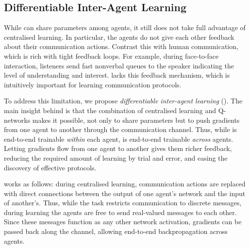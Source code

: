 \subsection{Differentiable Inter-Agent Learning}\label{subsec:diff-comm}

While \rec can share parameters among agents, it still does not take full advantage of centralised learning.  In particular, the agents do not give each other feedback about their communication actions.  Contrast this with human communication, which is rich with tight feedback loops. For example, during face-to-face interaction, listeners send fast nonverbal queues to the speaker indicating the level of understanding and interest.  \rec lacks this  feedback mechanism, which is intuitively important for learning communication protocols. 

To address this limitation, we propose \emph{differentiable inter-agent learning} (\dic).  The main insight behind \dic is that the combination of centralised learning and Q-networks makes it possible, not only to share parameters but to push gradients from one agent to another through the communication channel.  Thus, while \rec is end-to-end trainable \emph{within} each agent, \dic is end-to-end trainable \emph{across} agents.  Letting gradients flow from one agent to another gives them richer feedback, reducing the required amount of learning by trial and error, and easing the discovery of effective protocols.

\dic works as follows: during centralised learning, communication actions are replaced with direct connections between the output of one agent's network and the input of another's.  Thus, while the task restricts communication to discrete messages, during learning the agents are free to send real-valued messages to each other.  Since these messages function as any other network activation, gradients can be passed back along the channel, allowing end-to-end backpropagation across agents.

